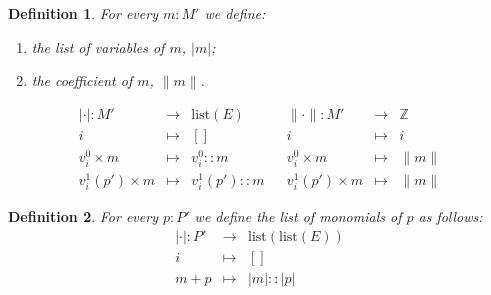 \documentclass{article}
\newtheorem{definition}{Definition}[section]
\newcommand{\Z}{{\mathbb Z}}
\begin{document}
\begin{definition}\label{def:monabs}
For every $m:M'$ we define:
\begin{enumerate}
\item the \emph{list of variables} of $m$, $|m|$;
\item the \emph{coefficient} of $m$, $\|m\|$.
\end{enumerate}
\[\begin{array}{rclcrcl}
|\cdot| : M' & \to & \mathrm{list}(E) & & \|\cdot\| : M' & \to & \Z \\
 i & \mapsto & [] & & i & \mapsto & i \\
 v^0_i\times m & \mapsto & v^0_i :: m & & v^0_i\times m & \mapsto & \|m\| \\
 v^1_i(p')\times m & \mapsto & v^1_i(p') :: m
  & & v^1_i(p')\times m & \mapsto & \|m\|
\end{array}\]
\end{definition}

\begin{definition}\label{def:polabs}
For every $p:P'$ we define the \emph{list of monomials} of $p$ as follows:
\begin{eqnarray*}
|\cdot| : P' & \to & \mathrm{list}(\mathrm{list}(E)) \\
 i & \mapsto & [] \\
 m+p & \mapsto & |m| :: |p|
\end{eqnarray*}
\end{definition}
\end{document}
